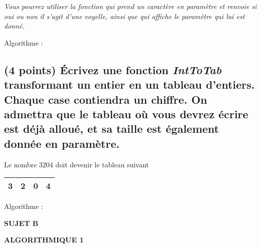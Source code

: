 \documentclass[11pt,a4paper]{article}
\newcommand{\TitreMatiere}{Algorithmique 1}
\begin{document}

\noindent \textit{Vous pourrez utiliser la fonction  qui prend un caractère en paramètre et renvoie si oui ou non il s'agit d'une voyelle, ainsi que  qui affiche le paramètre qui lui est donné.}

\begin{center}
Algorithme :

\bigskip

\end{center}


\clearpage


\subsection{(4 points) \'Ecrivez une fonction \og \textit{IntToTab} \fg{} transformant un entier en un tableau d'entiers. Chaque case contiendra un chiffre. On admettra que le tableau où vous devrez écrire est déjà alloué, et sa taille est également donnée en paramètre. }


\begin{center}
  Le nombre $ 3204 $ doit devenir le tableau suivant

  \smallskip

  \begin{tabular}{| c | c | c | c |}
    \hline
    3 & 2 & 0 & 4 \\
    \hline
  \end{tabular}
\end{center}


\begin{center}
Algorithme :

\bigskip

\end{center}


\clearpage




\vfillFirst

\begin{center}

\begin{LARGE}
\textbf{SUJET B}

\bigskip

\textbf{\MakeUppercase{\TitreMatiere}}
\end{LARGE}

\end{center}

\vfillLast
\end{document}
